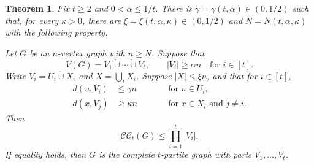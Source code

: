 \documentclass[10pt,a4paper]{amsart}
\newtheorem{theorem}{Theorem}
\newcommand{\CC}{\mathcal{CC}}
\newcommand{\dotcupunion}{\mathbin{\dot\cup}}
\begin{document}
\begin{theorem}\label{cov:thm:transversal-matching}
Fix \(t\ge 2\) and \(0<\alpha\le 1/t\). There is \(\gamma=\gamma(t,\alpha)\in(0,1/2)\) such that, for every
\(\kappa>0\), there are \(\xi=\xi(t,\alpha,\kappa)\in(0,1/2)\) and \(N=N(t,\alpha,\kappa)\) with the following property.

Let \(G\) be an \(n\)-vertex graph with \(n\ge N\). Suppose that
\begin{equation*}
V(G)=V_1\dotcupunion\cdots\dotcupunion V_t,
\qquad |V_i|\ge \alpha n\quad\text{for }i\in[t].
\end{equation*}
Write $V_i=U_i\dotcupunion X_i$ and $X=\bigcup_iX_i$. Suppose \(|X|\le \xi n\), and that for \(i\in[t]\),
\begin{equation*}
  \begin{aligned}
    d(u,V_i)&\le \gamma n \qquad&&\text{for }u\in U_i,\\
    d(x,V_j)&\ge \kappa n \qquad&&\text{for }x\in X_i\text{ and }j\ne i.
  \end{aligned}
\end{equation*}
Then
\begin{equation*}
\CC_t(G)\le\prod_{i=1}^t|V_i|.
\end{equation*}
If equality holds, then $G$ is the complete $t$-partite graph with parts $V_1,\ldots,V_t$.
\end{theorem}
\end{document}
